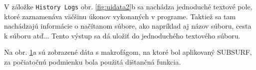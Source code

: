 \documentclass[a4paper,11pt,oneside]{article}%
\begin{document}
V záložke \texttt{History Logs} obr. \ref{fig:uidata2}b sa nachádza jednoduché textové pole, ktoré zaznamenáva väčšinu úkonov vykonaných v programe. Taktiež sa tam nachádzajú informácie o načítanom súbore, ako napríklad aj názov súboru, cesta k súboru atď... Tento výstup sa dá uložiť do jednoduchého textového súboru.

Na obr. \ref{fig:uidata3}a sú zobrazené dáta s makrofágom, na ktoré bol aplikovaný SUBSURF, za počiatočnú podmienku bola použitá dištančná funkcia.

\begin{figure}[H]%
    \centering
    \qquad
    \caption{}%
    \label{fig:uidata3}%
\end{figure}
\end{document}
